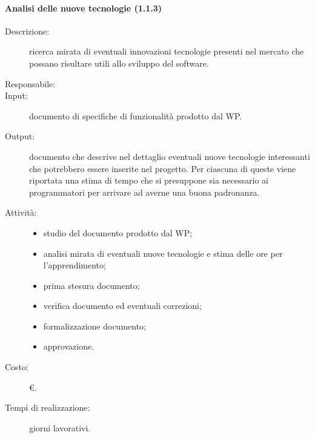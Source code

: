 \paragraph{Analisi delle nuove tecnologie (1.1.3)}
\begin{description}
\item[Descrizione:] ricerca mirata di eventuali innovazioni tecnologie presenti nel mercato che possano risultare utili allo sviluppo del software.
\item[Responsabile:]
\item[Input:] documento di specifiche di funzionalità prodotto dal WP.
\item[Output:] documento che descrive nel dettaglio eventuali nuove tecnologie interessanti che potrebbero essere inserite nel progetto. Per ciascuna di queste viene riportata una stima di tempo che si presuppone sia necessario ai programmatori per arrivare ad averne una buona padronanza.
\item[Attività:]
\begin{itemize}
\item studio del documento prodotto dal WP;
\item analisi mirata di eventuali nuove tecnologie e stima delle ore per l'apprendimento;
\item prima stesura documento;
\item verifica documento ed eventuali correzioni;
\item formalizzazione documento;
\item approvazione.
\end{itemize}
\item[Costo:] \euro{}.
\item[Tempi di realizzazione:]  giorni lavorativi.
\end{description}

